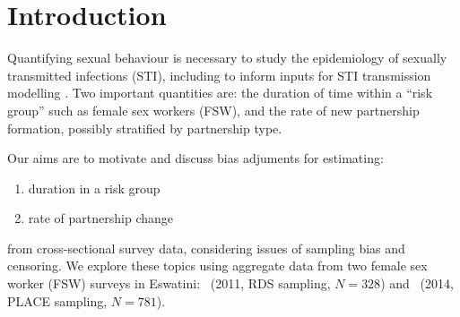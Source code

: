 \section{Introduction}
Quantifying sexual behaviour
is necessary to study the epidemiology of sexually transmitted infections (STI),
including to inform inputs for STI transmission modelling \cite{Fenton2001}.
Two important quantities are:
the duration of time within a ``risk group'' such as female sex workers (FSW), and
the rate of new partnership formation, possibly stratified by partnership type.
\par
Our aims are to motivate and discuss bias adjuments for estimating:
\begin{enumerate}
  \item duration in a risk group
  \item rate of partnership change
\end{enumerate}
from cross-sectional survey data,
considering issues of sampling bias and censoring.
We explore these topics using aggregate data from
two female sex worker (FSW) surveys in Eswatini:
\cite{Baral2014}~(2011, RDS sampling, $N = 328$) and
\cite{EswKP2014}~(2014, PLACE sampling, $N = 781$).
